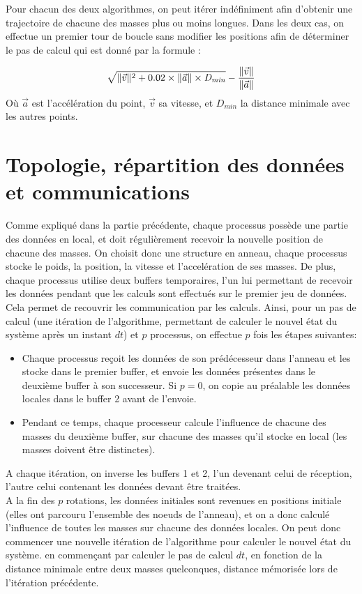 \documentclass[a4paper,11pt]{article}
\begin{document}
Pour chacun des deux algorithmes, on peut itérer indéfiniment afin d'obtenir une trajectoire de chacune des masses plus ou moins longues. Dans les deux cas, on effectue un premier tour de boucle sans modifier les positions afin de déterminer le pas de calcul qui est donné par la formule :

\[
\sqrt{\|\vec{v}\|^2 + 0.02 \times \|\vec{a}\| \times \mathit{D_{min}}} - \frac{\| \vec{v}\|}{\| \vec{a} \|}\\
\] 
Où $\vec{a}$ est l'accélération du point, $\vec{v}$ sa vitesse, et $\mathit{D_{min}}$ la distance minimale avec les autres points.




\section{Topologie, répartition des données et communications}
Comme expliqué dans la partie précédente, chaque processus possède une partie des données en local, et doit régulièrement recevoir la nouvelle position de chacune des masses. On choisit donc une structure en anneau, chaque processus stocke le poids, la position, la vitesse et l'accelération de ses masses. De plus, chaque processus utilise deux buffers temporaires, l'un lui permettant de recevoir les données pendant que les calculs sont effectués sur le premier jeu de données. Cela permet de recouvrir les communication par les calculs. Ainsi, pour un pas de calcul (une itération de l'algorithme, permettant de calculer le nouvel état du système après un instant $dt$) et $p$ processus, on effectue $p$ fois les étapes suivantes:
\begin{itemize}
\item Chaque processus reçoit les données de son prédécesseur dans l'anneau et les stocke dans le premier buffer, et envoie les données présentes dans le deuxième buffer à son successeur. Si $p = 0$, on copie au préalable les données locales dans le buffer 2 avant de l'envoie.
\item Pendant ce temps, chaque processeur calcule l'influence de chacune des masses du deuxième buffer, sur chacune des masses qu'il stocke en local (les masses doivent être distinctes).
\end{itemize}
 A chaque itération, on inverse les buffers 1 et 2, l'un devenant celui de réception, l'autre celui contenant les données devant être traitées.\\
 
 A la fin des $p$ rotations, les données initiales sont revenues en positions initiale (elles ont parcouru l'ensemble des noeuds de l'anneau), et on a donc calculé l'influence de toutes les masses sur chacune des données locales.
 On peut donc commencer une nouvelle itération de l'algorithme pour calculer le nouvel état du système. en commençant par calculer le pas de calcul $dt$, en fonction de la distance minimale entre deux masses quelconques, distance mémorisée lors de l'itération précédente.
 
\end{document}
